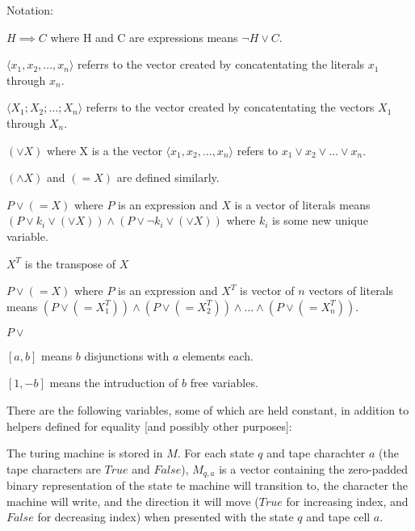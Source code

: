 \documentclass[12pt]{article}
\begin{document}
Notation:

$H \implies C$ where H and C are expressions means $\lnot H \lor C$.

$\langle x_1,x_2,\dots,x_n\rangle$ referrs to the vector created by concatentating the literals $x_1$ through $x_n$.

$\langle X_1;X_2;\dots;X_n\rangle$ referrs to the vector created by concatentating the vectors $X_1$ through $X_n$.

$(\lor X)$ where X is a the vector $\langle x_1,x_2,\dots,x_n\rangle$ refers to $x_1 \lor x_2 \lor \dots \lor x_n$.

$(\land X)$ and $(= X)$ are defined similarly.

$P\lor(=X)$ where $P$ is an expression and $X$ is a vector of literals means $(P\lor k_i \lor (\lor X)) \land (P\lor \lnot k_i \lor (\lor X))$ where $k_i$ is some new unique variable.

$X^T$ is the transpose of $X$

$P\lor(=X)$ where $P$ is an expression and $X^T$ is vector of $n$ vectors of literals means $(P\lor(=X^T_1)) \land (P\lor(=X^T_2)) \land \dots \land (P\lor(=X^T_n))$.

$P\lor$

$[a,b]$ means $b$ disjunctions with $a$ elements each.

$[1,-b]$ means the intruduction of $b$ free variables.







There are the following variables, some of which are held constant, in addition to helpers defined for equality [and possibly other purposes]:

The turing machine is stored in $M$. For each state $q$ and tape charachter $a$ (the tape characters are $True$ and $False$), $M_{q,a}$ is a vector containing the zero-padded binary representation of the state te machine will transition to, the character the machine will write, and the direction it will move ($True$ for increasing index, and $False$ for decreasing index) when presented with the state $q$ and tape cell $a$.
\end{document}
